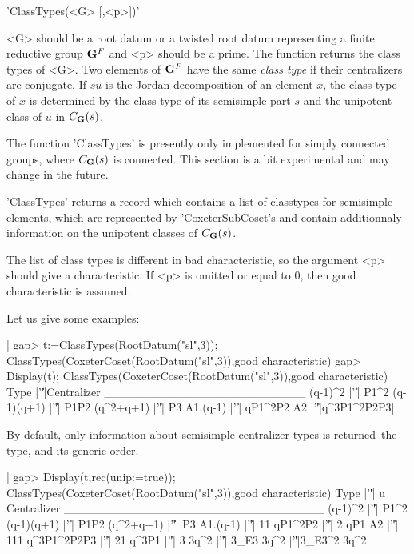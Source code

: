 
'ClassTypes(<G> [,<p>])'

<G>  should be a root  datum or a twisted  root datum representing a finite
reductive group ${\bf G}^F$ and <p> should be a prime. The function returns the
class  types of <G>. Two elements of ${\bf G}^F$ have the same {\em class type}
if their centralizers are conjugate. If $su$ is the Jordan decomposition of
an  element $x$, the class  type of $x$ is  determined by the class type of
its semisimple part $s$ and the unipotent class of $u$ in $C_{\bf G}(s)$.

The   function  'ClassTypes'  is  presently  only  implemented  for  simply
connected  groups, where  $C_{\bf G}(s)$ is  connected. This  section is  a bit
experimental and may change in the future.

'ClassTypes'  returns  a  record  which  contains  a list of classtypes for
semisimple  elements,  which  are  represented  by  'CoxeterSubCoset's  and
contain additionnaly information on the unipotent classes of $C_{\bf G}(s)$.

The list of class types is different in bad characteristic, so the argument
<p>  should give a characteristic.  If <p> is omitted  or equal to 0, then
good characteristic is assumed.

Let us give some examples:

|    gap> t:=ClassTypes(RootDatum("sl",3));
    ClassTypes(CoxeterCoset(RootDatum("sl",3)),good characteristic)
    gap> Display(t);
    ClassTypes(CoxeterCoset(RootDatum("sl",3)),good characteristic)
          Type |'\|'|Centralizer
    ________________________
    (q-1)^2    |'\|'|       P1^2
    (q-1)(q+1) |'\|'|       P1P2
    (q^2+q+1)  |'\|'|         P3
    A1.(q-1)   |'\|'|    qP1^2P2
    A2         |'\|'|q^3P1^2P2P3|

By   default,  only  information  about  semisimple  centralizer  types  is
returned\:\ the type, and its generic order.

|    gap> Display(t,rec(unip:=true));
    ClassTypes(CoxeterCoset(RootDatum("sl",3)),good characteristic)
          Type |'\|'|     u Centralizer
    _______________________________
    (q-1)^2    |'\|'|              P1^2
    (q-1)(q+1) |'\|'|              P1P2
    (q^2+q+1)  |'\|'|                P3
    A1.(q-1)   |'\|'|    11     qP1^2P2
               |'\|'|     2         qP1
    A2         |'\|'|   111 q^3P1^2P2P3
               |'\|'|    21       q^3P1
               |'\|'|     3        3q^2
               |'\|'|  3_E3        3q^2
               |'\|'|3_E3^2        3q^2|

